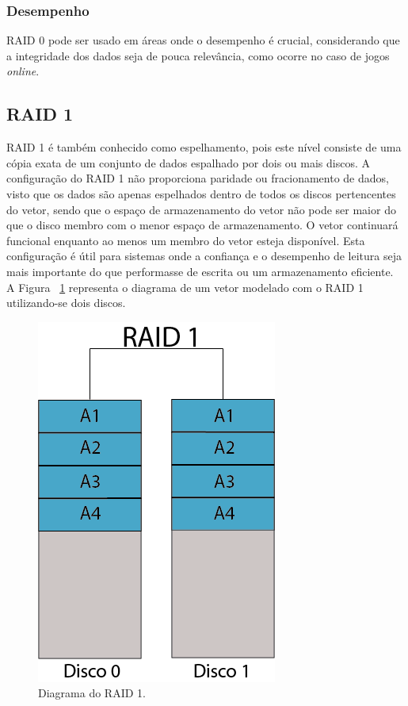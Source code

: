 \subsubsection{Desempenho}

RAID 0 pode ser usado em áreas onde o desempenho é crucial, considerando que a integridade dos dados seja de pouca relevância, como ocorre no caso de jogos \textit{online}.\\

\subsection{RAID 1}

RAID 1 é também conhecido como espelhamento, pois este nível consiste de uma cópia exata de um conjunto de dados espalhado por dois ou mais discos. A configuração do RAID 1 não proporciona paridade ou fracionamento de dados, visto que os dados são apenas espelhados dentro de todos os discos pertencentes do vetor, sendo que o espaço de armazenamento do vetor não pode ser maior do que o disco membro com o menor espaço de armazenamento. O vetor continuará funcional enquanto ao menos um membro do vetor esteja disponível. Esta configuração é útil para sistemas onde a confiança e o desempenho de leitura seja mais importante do que performasse de escrita ou um armazenamento eficiente. \\

A Figura ~\ref{fig:raid1} representa o diagrama de um vetor modelado com o RAID 1 utilizando-se dois discos.\\

\begin{figure}[htb]
	\begin{center}
		
		\includegraphics[clip,scale=0.5]{images/RAID_1.png}
		\caption{Diagrama do RAID 1. }
		\label{fig:raid1}
	\end{center}
\end{figure} 

